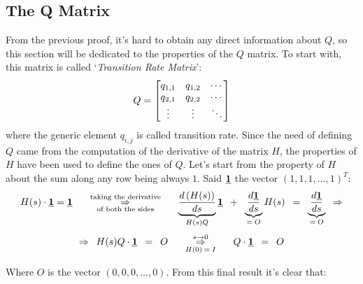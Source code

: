 \documentclass[12pt,a4paper]{article}
\begin{document}
\subsection{The Q Matrix}
From the previous proof, it's hard to obtain any direct information about $Q$, so this section will be dedicated to the properties of the $Q$ matrix. To start with, this matrix is called `\emph{Transition Rate Matrix}':
$$
Q=\left[
\begin{matrix}
q_{1,1} & q_{1,2} &  \cdots \cr
q_{2,1} & q_{2,2} &  \cdots \cr
\vdots & \vdots &  \ddots
\end{matrix}
\right]
$$
where the generic element $q_{i,j}$ is called transition rate. Since the need of defining $Q$ came from the computation of the derivative of the matrix $H$, the properties of $H$ have been used to define the ones of $Q$. Let's start from the property of $H$ about the sum along any row being always $1$. Said $\textrm{\underline{\textbf{1}}}$ 
the vector $\left(1,1,1,\dots,1\right)^T$:
$$
H(s)\cdot \textrm{\underline{\textbf{1}}} = \textrm{\underline{\textbf{1}}}
\hspace{15pt}
\overset{\textrm{taking the derivative}}{\underset{\textrm{of both the sides}}{\Rightarrow}}
\hspace{15pt}
\underbrace{\frac{d\left(H(s)\right)}{ds}}_{H(s)Q}\textrm{\underline{\textbf{1}}}
\hspace{5pt}+\hspace{5pt}
\underbrace{\frac{d\textrm{\underline{\textbf{1}}}}{ds}}_{
=\hspace{2pt}O}H(s)
\hspace{5pt}=\hspace{5pt}
\underbrace{\frac{d\textrm{\underline{\textbf{1}}}}{ds}}_{=\hspace{2pt}O}
\hspace{5pt}\Rightarrow
$$
$$
\Rightarrow\hspace{5pt}
H(s)Q\cdot \textrm{\underline{\textbf{1}}}\hspace{5pt}=\hspace{5pt}O
\hspace{15pt}
\overset{s\rightarrow 0}{\underset{H(0)\hspace{2pt}=\hspace{2pt}I}{\Rightarrow}}
\hspace{15pt}
Q\cdot \textrm{\underline{\textbf{1}}}\hspace{5pt}=\hspace{5pt}O
$$

\bigskip
\noindent
Where $O$ is the vector $\left(0,0,0,\dots,0\right)$. From this final result it's clear that:
\end{document}
